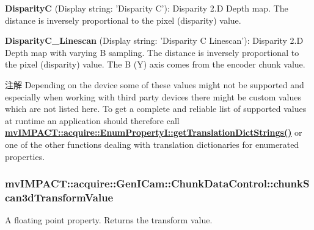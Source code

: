 \begin{DoxyItemize}
\item {\bfseries Disparity\+C} (Display string\+: 'Disparity C')\+: Disparity 2.\+D Depth map. The distance is inversely proportional to the pixel (disparity) value.
\item {\bfseries Disparity\+C\+\_\+\+Linescan} (Display string\+: 'Disparity C Linescan')\+: Disparity 2.\+D Depth map with varying B sampling. The distance is inversely proportional to the pixel (disparity) value. The B (Y) axis comes from the encoder chunk value.
\end{DoxyItemize}

\begin{DoxyNote}{注解}
Depending on the device some of these values might not be supported and especially when working with third party devices there might be custom values which are not listed here. To get a complete and reliable list of supported values at runtime an application should therefore call {\bfseries \hyperlink{classmv_i_m_p_a_c_t_1_1acquire_1_1_enum_property_i_a0ba6ccbf5ee69784d5d0b537924d26b6}{mv\+I\+M\+P\+A\+C\+T\+::acquire\+::\+Enum\+Property\+I\+::get\+Translation\+Dict\+Strings()}} or one of the other functions dealing with translation dictionaries for enumerated properties. 
\end{DoxyNote}
\hypertarget{classmv_i_m_p_a_c_t_1_1acquire_1_1_gen_i_cam_1_1_chunk_data_control_a2236122637d64d832aa5ebfaef7c0f29}{
\subsubsection[{chunk\+Scan3d\+Transform\+Value}]{ mv\+I\+M\+P\+A\+C\+T\+::acquire\+::\+Gen\+I\+Cam\+::\+Chunk\+Data\+Control\+::chunk\+Scan3d\+Transform\+Value}}\label{classmv_i_m_p_a_c_t_1_1acquire_1_1_gen_i_cam_1_1_chunk_data_control_a2236122637d64d832aa5ebfaef7c0f29}


A floating point property. Returns the transform value. 

